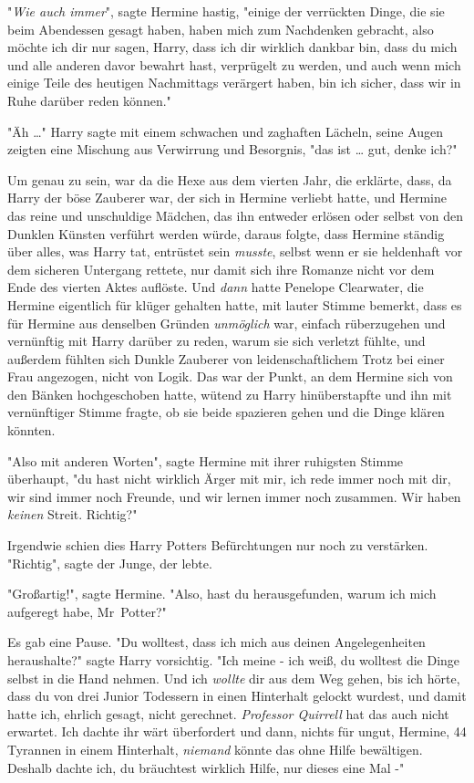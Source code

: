 {"\emph{Wie auch immer}", sagte Hermine hastig, "einige der verrückten Dinge, die sie beim Abendessen gesagt haben, haben mich zum Nachdenken gebracht, also möchte ich dir nur sagen, Harry, dass ich dir wirklich dankbar bin, dass du mich und alle anderen davor bewahrt hast, verprügelt zu werden, und auch wenn mich einige Teile des heutigen Nachmittags verärgert haben, bin ich sicher, dass wir in Ruhe darüber reden können."

"Äh …" Harry sagte mit einem schwachen und zaghaften Lächeln, seine Augen zeigten eine Mischung aus Verwirrung und Besorgnis, "das ist … gut, denke ich?"

Um genau zu sein, war da die Hexe aus dem vierten Jahr, die erklärte, dass, da Harry der böse Zauberer war, der sich in Hermine verliebt hatte, und Hermine das reine und unschuldige Mädchen, das ihn entweder erlösen oder selbst von den Dunklen Künsten verführt werden würde, daraus folgte, dass Hermine ständig über alles, was Harry tat, entrüstet sein \emph{musste}, selbst wenn er sie heldenhaft vor dem sicheren Untergang rettete, nur damit sich ihre Romanze nicht vor dem Ende des vierten Aktes auflöste. Und \emph{dann} hatte Penelope Clearwater, die Hermine eigentlich für klüger gehalten hatte, mit lauter Stimme bemerkt, dass es für Hermine aus denselben Gründen \emph{unmöglich} war, einfach rüberzugehen und vernünftig mit Harry darüber zu reden, warum sie sich verletzt fühlte, und außerdem fühlten sich Dunkle Zauberer von leidenschaftlichem Trotz bei einer Frau angezogen, nicht von Logik. Das war der Punkt, an dem Hermine sich von den Bänken hochgeschoben hatte, wütend zu Harry hinüberstapfte und ihn mit vernünftiger Stimme fragte, ob sie beide spazieren gehen und die Dinge klären könnten.

"Also mit anderen Worten", sagte Hermine mit ihrer ruhigsten Stimme überhaupt, "du hast nicht wirklich Ärger mit mir, ich rede immer noch mit dir, wir sind immer noch Freunde, und wir lernen immer noch zusammen. Wir haben \emph{keinen} Streit. Richtig?"

Irgendwie schien dies Harry Potters Befürchtungen nur noch zu verstärken. "Richtig", sagte der Junge, der lebte.

"Großartig!", sagte Hermine. "Also, hast du herausgefunden, warum ich mich aufgeregt habe, Mr~Potter?"

Es gab eine Pause. "Du wolltest, dass ich mich aus deinen Angelegenheiten heraushalte?" sagte Harry vorsichtig. "Ich meine - ich weiß, du wolltest die Dinge selbst in die Hand nehmen. Und ich \emph{wollte} dir aus dem Weg gehen, bis ich hörte, dass du von drei Junior Todessern in einen Hinterhalt gelockt wurdest, und damit hatte ich, ehrlich gesagt, nicht gerechnet. \emph{Professor Quirrell} hat das auch nicht erwartet. Ich dachte ihr wärt überfordert und dann, nichts für ungut, Hermine, 44 Tyrannen in einem Hinterhalt, \emph{niemand} könnte das ohne Hilfe bewältigen. Deshalb dachte ich, du bräuchtest wirklich Hilfe, nur dieses eine Mal -"

}
